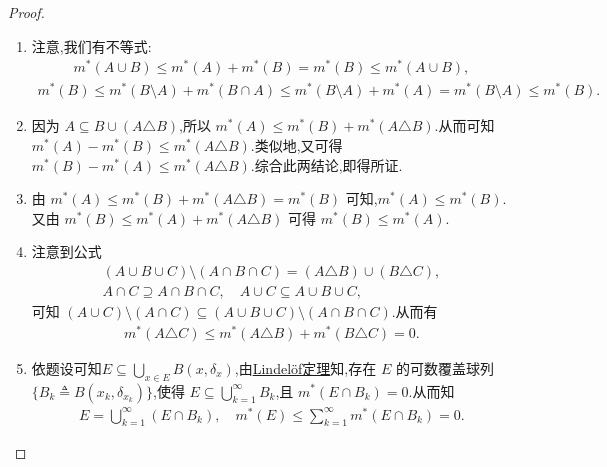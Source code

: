 \documentclass[../../main.tex]{subfiles}%
\begin{document}
\begin{proof}
\begin{enumerate}[(1)]
\item 注意,我们有不等式:
\begin{align*}
m^*(A\cup B)\leqslant m^*(A)+m^*(B)=m^*(B)\leqslant m^*(A\cup B),
\end{align*}
\begin{align*}
m^*(B)\leqslant m^*(B\setminus A)+m^*(B\cap A)\leqslant m^*(B\setminus A)+m^*(A)=m^*(B\setminus A)\leqslant m^*(B).
\end{align*}

\item 因为 $A\subseteq B\cup(A\triangle B)$,所以 $m^*(A)\leqslant m^*(B)+m^*(A\triangle B)$.从而可知 $m^*(A)-m^*(B)\leqslant m^*(A\triangle B)$.类似地,又可得 $m^*(B)-m^*(A)\leqslant m^*(A\triangle B)$.综合此两结论,即得所证.

\item 由 $m^*(A)\leqslant m^*(B)+m^*(A\triangle B)=m^*(B)$ 可知,$m^*(A)\leqslant m^*(B)$.又由 $m^*(B)\leqslant m^*(A)+m^*(A\triangle B)$ 可得 $m^*(B)\leqslant m^*(A)$.

\item 注意到公式
\begin{align*}
(A\cup B\cup C)\setminus(A\cap B\cap C)=(A\triangle B)\cup(B\triangle C),\\
A\cap C\supseteq A\cap B\cap C,\quad A\cup C\subseteq A\cup B\cup C,
\end{align*}
可知 $(A\cup C)\setminus(A\cap C)\subseteq(A\cup B\cup C)\setminus(A\cap B\cap C)$.从而有
\begin{align*}
m^*(A\triangle C)\leqslant m^*(A\triangle B)+m^*(B\triangle C)=0.
\end{align*}
\item 依题设可知$E\subseteq \bigcup_{x\in E}{B\left( x,\delta _x \right)}$,由\hyperref[theorem:Lindelöf定理]{Lindelöf定理}知,存在 $E$ 的可数覆盖球列 $\{B_k\triangleq B(x_k,\delta_{x_k})\}$,使得 $E\subseteq\bigcup\limits_{k=1}^{\infty}B_k$,且 $m^*(E\cap B_k)=0$.从而知
\begin{align*}
E=\bigcup\limits_{k=1}^{\infty}(E\cap B_k),\quad m^*(E)\leqslant\sum\limits_{k=1}^{\infty}m^*(E\cap B_k)=0.
\end{align*}


\end{enumerate}
\end{proof}
\end{document}
